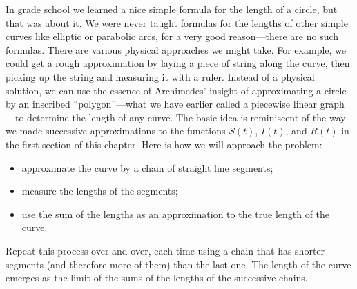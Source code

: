 In grade school we learned a nice simple formula for the length of a
 circle, but that was about it.  We were never taught formulas for the
 lengths of other simple curves like elliptic or parabolic arcs, for a
 very good reason---there are no such formulas.  There are various
 physical approaches we might take.  For example, we could get a rough
 approximation by laying a piece of string along the curve, then
 picking up the string and measuring it with a ruler.  Instead of a
 physical solution, we can use the essence of Archimedes' insight of
 approximating a circle by an inscribed ``polygon''---what we have
 earlier called a piecewise linear graph---to determine the length of
 any curve.  The basic idea is reminiscent of the way we made
 successive approximations to the functions $S(t)$, $I(t)$, and $R(t)$
 in the first section of this chapter.  Here is how we will approach
 the problem:
\begin{itemize}

\item approximate the curve by a chain of straight line segments;

\item measure the lengths of the segments;

\item use the sum of the lengths as an approximation to the true
 length of the curve.

\end{itemize}
Repeat this process over and over, each time using a chain that has
 shorter segments (and therefore more of them) than the last one.  The
 length of the curve emerges as the limit of the sums of the lengths
 of the successive chains.



